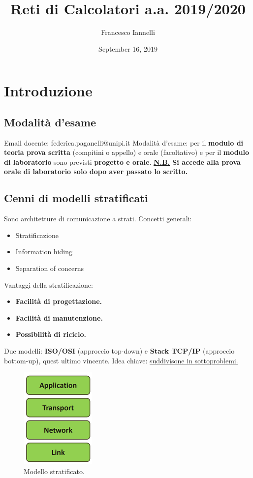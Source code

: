 \documentclass[11pt,a4paper,oneside]{book}
\theoremstyle{definition}
\begin{document}
\title{Reti di Calcolatori a.a. 2019/2020}
\author{Francesco Iannelli}
\date{September 16, 2019}
\maketitle

\setcounter{tocdepth}{5}
\tableofcontents

\pagebreak

\chapter{Introduzione}
\section{Modalità d'esame}
Email docente: federica.paganelli@unipi.it\newline
Modalità d'esame: per il \textbf{modulo di teoria prova scritta} (compitini o appello) e orale (facoltativo) e per il \textbf{modulo di laboratorio} sono previsti \textbf{progetto e orale}. \newline
\textbf{\underline{N.B.} Si accede alla prova orale di laboratorio solo dopo aver passato lo scritto.}

\section{Cenni di modelli stratificati}
Sono architetture di comunicazione a strati. \newline
Concetti generali:
\begin{itemize}
	\item Stratificazione
	\item Information hiding
	\item Separation of concerns
\end{itemize}
Vantaggi della stratificazione:
\begin{itemize}
	\item \textbf{Facilità di progettazione.}
	\item \textbf{Facilità di manutenzione.}
	\item \textbf{Possibilità di riciclo.}
\end{itemize}
Due modelli: \textbf{ISO/OSI} (approccio top-down) e \textbf{Stack TCP/IP} (approccio bottom-up), quest ultimo vincente.\newline
Idea chiave: \underline{suddivisone in sottoproblemi.}
\begin{figure}[!h]
	\includegraphics[scale=0.8]{Immagini/Modelli_Strat.png}
	\centering
	\caption{Modello stratificato.}
\end{figure}
\end{document}
